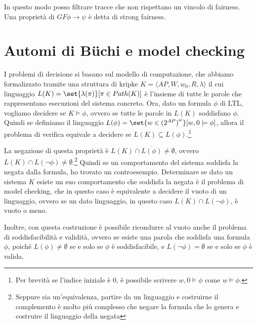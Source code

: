 In questo modo posso filtrare tracce che non rispettano un vincolo di fairness. Una proprietà di \(G F \phi \to \psi\) è detta di strong fairness.

\section{Automi di Büchi e model checking}\label{sec:buchi}

I problemi di decisione si basano sul modello di computazione, che abbiamo formalizzato tramite una struttura di kripke \(K = \langle AP, W, w_0, R, \lambda\rangle\) il cui linguaggio \(L(K) = \set{\lambda(\pi)}[\pi \in Path(K)]\) è l'insieme di tutte le parole che rappresentano esecuzioni del sistema concreto. Ora, dato un formula \(\phi\) di LTL\@, vogliamo decidere se \(K \models \phi\), ovvero se tutte le parole in \(L(K)\) soddisfano \(\phi\). Quindi se definiamo il linguaggio \(L(\phi) = \set{w \in {(2^{AP})}^\omega }[ w,0 \models \phi]\), allora il problema di verifica equivale a decidere se \(L(K) \subseteq L(\phi)\).\footnote{Per brevità se l'indice iniziale è \(0\), è possibile scrivere \(w,0\models \phi\) come \(w\models \phi\).}

La negazione di questa proprietà è \(L(K) \cap \overline{L(\phi)} \neq \emptyset\), ovvero \(L(K) \cap L(\neg \phi) \neq \emptyset\).\footnote{Seppure sia un'equivalenza, partire da un linguaggio e costruirne il complemento è molto più complesso che negare la formula che lo genera e costruire il linguaggio della negata} Quindi se un comportamento del sistema soddisfa la negata dalla formula, ho trovato un controesempio. Determinare se dato un sistema \(K\) esiste un suo comportamento che soddisfa la negata è il problema di model checking, che in questo caso è equivalente a decidere il vuoto di un linguaggio, ovvero se un dato linguaggio, in questo caso \(L(K) \cap L(\neg \phi)\), è vuoto o meno. 

Inoltre, con questa costruzione è possibile ricondurre al vuoto anche il problema di soddisfacibilità e validità, ovvero se esiste una parola che soddisfa una formula \(\phi\), poiché \(L(\phi) \neq \emptyset\) se e solo se \(\phi\) è soddisfacibile, e \(L(\neg \phi) = \emptyset\) se e solo se \(\phi\) è valida.

